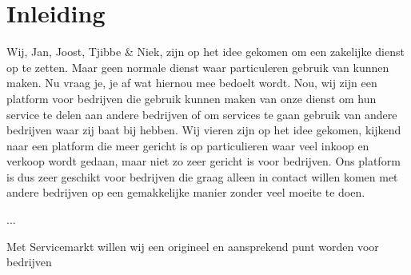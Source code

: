 \chapter{Inleiding}
Wij, Jan, Joost, Tjibbe \& Niek, zijn op het idee gekomen om een zakelijke dienst op te zetten. Maar geen normale dienst waar particuleren gebruik van kunnen maken.
Nu vraag je, je af wat hiernou mee bedoelt wordt. Nou, wij zijn een platform voor bedrijven die gebruik kunnen maken van onze dienst om hun service te delen aan andere bedrijven of om services te gaan gebruik van andere bedrijven waar zij baat bij hebben.
Wij vieren zijn op het idee gekomen, kijkend naar een platform die meer gericht is op particulieren waar veel inkoop en verkoop wordt gedaan, maar niet zo zeer gericht is voor bedrijven.
Ons platform is dus zeer geschikt voor bedrijven die graag alleen in contact willen komen met andere bedrijven op een gemakkelijke manier zonder veel moeite te doen.

...




Met Servicemarkt willen wij een origineel en aansprekend punt worden voor bedrijven
